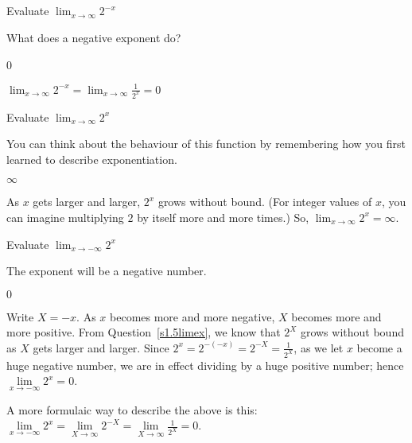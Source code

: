 \subsection*{\Procedural}

\begin{question}Evaluate
$\displaystyle\lim_{x \rightarrow \infty} 2^{-x}$
\end{question}
\begin{hint} What does a negative exponent do?
\end{hint}
\begin{answer} 0
\end{answer}
\begin{solution}
$\displaystyle\lim_{x \rightarrow \infty} 2^{-x}=
\displaystyle\lim_{x \rightarrow \infty} \frac{1}{2^x}=0
$
\end{solution}


\begin{Mquestion}\label{s1.5limex}Evaluate
$\displaystyle\lim_{x \rightarrow \infty} 2^x$
\end{Mquestion}
\begin{hint} You can think about the behaviour of this function by remembering how you first learned to describe exponentiation.
\end{hint}
\begin{answer} $\infty$
\end{answer}
\begin{solution} As $x$ gets larger and larger, $2^x$ grows without bound. (For integer values of $x$, you can imagine multiplying $2$ by itself more and more times.) So, $\displaystyle\lim_{x \rightarrow \infty}2^x=\infty$.
\end{solution}


\begin{Mquestion}Evaluate
$\displaystyle\lim_{x \rightarrow -\infty} 2^x$
\end{Mquestion}
\begin{hint} The exponent will be a negative number.
\end{hint}
\begin{answer} $0$
\end{answer}
\begin{solution}
Write $X=-x$. As $x$ becomes more and more negative,
           $X$ becomes more and more positive. From Question~\ref{s1.5limex},
           we know that $2^X$ grows without bound as $X$ gets
           larger and larger. Since $2^x= 2^{-(-x)}= 2^{-X} =\frac{1}{2^X}$,
           as we let $x$ become a huge negative number, we are in
           effect dividing by a huge positive number; hence
           $\lim\limits_{x\rightarrow-\infty} 2^x = 0$.

           A more formulaic way to describe the above is this:
           $\lim\limits_{x\rightarrow-\infty} 2^x
            = \lim\limits_{X\rightarrow\infty} 2^{-X}
            = \lim\limits_{X\rightarrow\infty} \frac{1}{2^X}
            =0$.
\end{solution}


